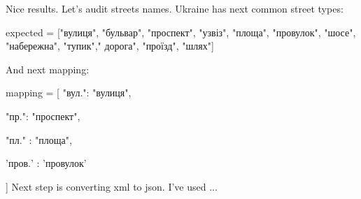 \documentclass[a4paper,12pt,twoside]{article}
\begin{document}
Nice results. Let's audit streets names. Ukraine has next common street types:\par
expected = ["\foreignlanguage{russian}{вулиця}",  "\foreignlanguage{russian}{бульвар}", "\foreignlanguage{russian}{проспект}", "\foreignlanguage{russian}{узвіз}", "\foreignlanguage{russian}{площа}", "\foreignlanguage{russian}{провулок}", "\foreignlanguage{russian}{шосе}", "\foreignlanguage{russian}{набережна}", "\foreignlanguage{russian}{тупик}"," \foreignlanguage{russian}{дорога}", "\foreignlanguage{russian}{проїзд}", "\foreignlanguage{russian}{шлях}"]\par
And next mapping:\par
mapping = [ "\foreignlanguage{russian}{вул.}": "\foreignlanguage{russian}{вулиця}",\par
            "\foreignlanguage{russian}{пр}.": "\foreignlanguage{russian}{проспект}",\par
            "\foreignlanguage{russian}{пл.}" : "\foreignlanguage{russian}{площа}",\par
            '\foreignlanguage{russian}{пров.}' : '\foreignlanguage{russian}{провулок}'\par
]
Next step is converting xml to json. I've used ...
\end{document}
